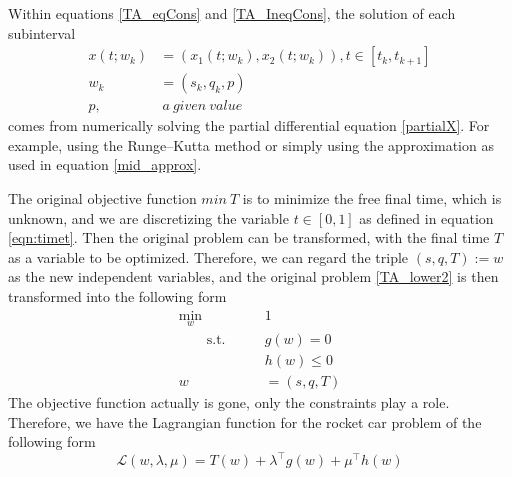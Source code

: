 	Within equations \ref{TA_eqCons} and \ref{TA_IneqCons}, the solution of each subinterval 
	\begin{equation}
		\begin{aligned}
			x(t; w_k) &= (x_1(t;w_k), x_2(t; w_k)),  t \in [t_{k}, t_{k+1}]\\
			w_k &= (s_k, q_k, p) \\
			p, & \   a \ given \ value
		\end{aligned}
	\end{equation}
	comes from numerically solving the partial differential equation \ref{partialX}. For example, using the Runge–Kutta method or simply using the approximation as used in equation \ref{mid_approx}. 
	
	The original objective function  $min \ T$ is to minimize the free final time, which is unknown, and we are discretizing the variable $t \in [0,1]$ as defined in equation \ref{eqn:timet}. Then the original problem can be transformed, with the final time $T$ as a variable to be optimized. Therefore, we can regard the triple $(s,q,T):= w$ as the new independent variables, and the original problem \ref{TA_lower2} is then transformed into the following form
	\begin{equation}
		\label{TA_Transform}
		\begin{aligned}
			\underset{w}{\text{min}} \qquad & 1	\\
			\qquad \text{s.t.}\qquad	&  g(w) = 0   \\
			&  h(w)	\leq 0  \\ 
			w &= (s, q, T)
		\end{aligned}
	\end{equation}
	The objective function actually is gone, only the constraints play a role. Therefore, we have the Lagrangian function for the rocket car problem of the following form
	\begin{equation}
		\mathcal{L}(w,\lambda, \mu) = T(w) + \lambda^\top g(w) +  \mu^\top h(w) 
		\label{eq_RC_Lag}
	\end{equation}
	
	
	
	
	
	
